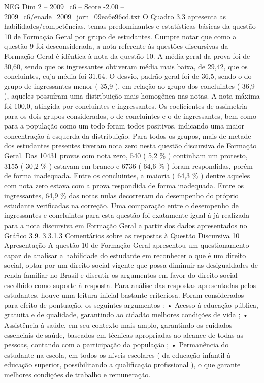 \begin{textsample}{NEG Dim 2 – 2009\_c6 – Score -2.00 – 2009\_c6/enade\_2009\_jorn\_09ea6e96cd.txt}
O Quadro 3.3 apresenta as habilidades/competências, temas predominantes e estatísticas básicas da questão 10 de Formação Geral por grupo de estudantes.
Cumpre notar que como a questão 9 foi desconsiderada, a nota referente às questões discursivas da Formação Geral é idêntica à nota da questão 10.
A média geral da prova foi de 30,60, sendo que os ingressantes obtiveram média mais baixa, de 29,42, que os concluintes, cuja média foi 31,64.
O desvio, padrão geral foi de 36,5, sendo o do grupo de ingressantes menor ( 35,9 ), em relação ao grupo dos concluintes ( 36,9 ), aqueles possuíram uma distribuição mais homogênea nas notas.
A nota máxima foi 100,0, atingida por concluintes e ingressantes.
Os coeficientes de assimetria para os dois grupos considerados, o de concluintes e o de ingressantes, bem como para a população como um todo foram todos positivos, indicando uma maior concentração à esquerda da distribuição.
Para todos os grupos, mais de metade dos estudantes presentes tiveram nota zero nesta questão discursiva de Formação Geral.
Das 10431 provas com nota zero, 540 ( 5,2 \% ) continham um protesto, 3155 ( 30,2 \% ) estavam em branco e 6736 ( 64,6 \% ) foram respondidas, porém de forma inadequada.
Entre os concluintes, a maioria ( 64,3 \% ) dentre aqueles com nota zero estava com a prova respondida de forma inadequada.
Entre os ingressantes, 64,9 \% das notas nulas decorreram do desempenho do próprio estudante verificadas na correção.
Uma comparação entre o desempenho de ingressantes e concluintes para esta questão foi exatamente igual à já realizada para a nota discursiva em Formação Geral a partir dos dados apresentados no Gráfico 3.9. 3.3.1.3 Comentários sobre as respostas à Questão Discursiva 10 Apresentação A questão 10 de Formação Geral apresentou um questionamento capaz de analisar a habilidade do estudante em reconhecer o que é um direito social, optar por um direito social vigente que possa diminuir as desigualdades de renda familiar no Brasil e discutir os argumentos em favor do direito social escolhido como suporte à resposta.
Para análise das respostas apresentadas pelos estudantes, houve uma leitura inicial bastante criteriosa.
Foram considerados para efeito de pontuação, os seguintes argumentos : • Acesso à educação pública, gratuita e de qualidade, garantindo ao cidadão melhores condições de vida ; • Assistência à saúde, em seu contexto mais amplo, garantindo os cuidados essenciais de saúde, baseados em técnicas apropriadas ao alcance de todas as pessoas, contando com a participação da população ; • Permanência do estudante na escola, em todos os níveis escolares ( da educação infantil à educação superior, possibilitando a qualificação profissional ), o que garante melhores condições de trabalho e remuneração.

\end{textsample}
